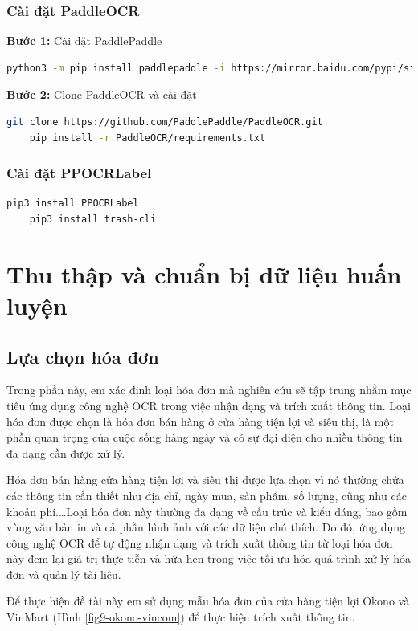 \subsubsection*{Cài đặt PaddleOCR}
\textbf{Bước 1:} Cài đặt PaddlePaddle
\begin{lstlisting}[language=bash]
    python3 -m pip install paddlepaddle -i https://mirror.baidu.com/pypi/simple
\end{lstlisting}

\textbf{Bước 2:} Clone PaddleOCR và cài đặt
\begin{lstlisting}[language=bash]
    git clone https://github.com/PaddlePaddle/PaddleOCR.git
    pip install -r PaddleOCR/requirements.txt
\end{lstlisting}

\subsubsection*{Cài đặt PPOCRLabel}
\begin{lstlisting}[language=bash]
    pip3 install PPOCRLabel
    pip3 install trash-cli
\end{lstlisting}


\section{Thu thập và chuẩn bị dữ liệu huấn luyện}
\subsection{Lựa chọn hóa đơn}
Trong phần này, em xác định loại hóa đơn mà nghiên cứu sẽ tập trung nhằm mục tiêu ứng dụng công nghệ OCR trong việc nhận dạng và trích xuất thông tin. Loại hóa đơn được chọn là hóa đơn bán hàng ở cửa hàng tiện lợi và siêu thị, là một phần quan trọng của cuộc sống hàng ngày và có sự đại diện cho nhiều thông tin đa dạng cần được xử lý.

Hóa đơn bán hàng cửa hàng tiện lợi và siêu thị được lựa chọn vì nó thường chứa các thông tin cần thiết như địa chỉ, ngày mua, sản phẩm, số lượng, cũng như các khoản phí.\ldots Loại hóa đơn này thường đa dạng về cấu trúc và kiểu dáng, bao gồm vùng văn bản in và cả phần hình ảnh với các dữ liệu chú thích. Do đó, ứng dụng công nghệ OCR để tự động nhận dạng và trích xuất thông tin từ loại hóa đơn này đem lại giá trị thực tiễn và hứa hẹn trong việc tối ưu hóa quá trình xử lý hóa đơn và quản lý tài liệu.

Để thực hiện đề tài này em sử dụng mẫu hóa đơn của cửa hàng tiện lợi Okono và VinMart (Hình \ref{fig9-okono-vincom}) để thực hiện trích xuất thông tin.

